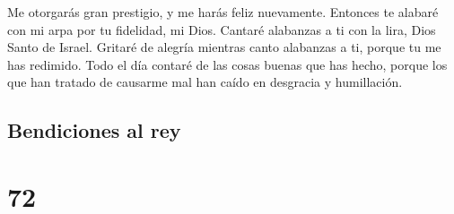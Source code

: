  Me otorgarás gran prestigio, y me harás feliz
nuevamente.  Entonces te alabaré con mi arpa por tu
fidelidad, mi Dios. Cantaré alabanzas a ti con la lira, Dios Santo de
Israel.  Gritaré de alegría mientras canto alabanzas a
ti, porque tu me has redimido.  Todo el día contaré de
las cosas buenas que has hecho, porque los que han tratado de causarme
mal han caído en desgracia y humillación.

\hypertarget{bendiciones-al-rey}{%
\subsection{Bendiciones al rey}\label{bendiciones-al-rey}}

\hypertarget{section-71}{%
\section{72}\label{section-71}}

